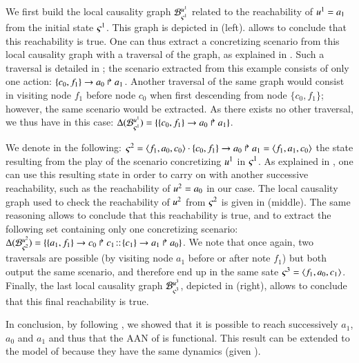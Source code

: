We first build the local causality graph ${\mathcal{B}_{\varsigma^1}^{u^1}}$
related to the reachability of $u^1 = a_1$ from the initial state $\varsigma^1$.
This graph is depicted in (left).
 allows to conclude that this reachability is true.
One can thus extract a concretizing scenario from this local causality graph
with a traversal of the graph, as explained in .
Such a traversal is detailed in ;
the scenario extracted from this example consists of only one action:
$\{c_0, f_1\}\rightarrow a_0\Rsh a_1$.
Another traversal of the same graph
would consist in visiting node $f_1$ before node $c_0$
when first descending from node $\{ c_0, f_1 \}$;
however, the same scenario would be extracted.
As there exists no other traversal, we thus have in this case:
$\Delta({\mathcal{B}_{\varsigma^1}^{u^1}}) = \{ \{c_0, f_1\}\rightarrow a_0\Rsh a_1 \}$.

We denote in the following:
$\varsigma^2 = \mbox{$\langle f_1, a_0, c_0 \rangle$} \cdot \{c_0, f_1\}\rightarrow a_0\Rsh a_1 =
\mbox{$\langle f_1, a_1, c_0 \rangle$}$
the state resulting from the play of the scenario concretizing
$u^1$ in $\varsigma^1$.
As explained in ,
one can use this resulting state in order to carry on with another
successive reachability,
such as the reachability of $u^2 = a_0$ in our case.
The local causality graph used to check the reachability of $u^2$
from $\varsigma^2$ is given in (middle).
The same reasoning allows to conclude that this reachability is true, and
to extract the following set containing only one concretizing scenario:
$\Delta({\mathcal{B}_{\varsigma^2}^{u^2}}) =
\{ \{a_1, f_1\}\rightarrow c_0\Rsh c_1 \!::\! \{c_1\}\rightarrow a_1\Rsh a_0 \}$.
We note that once again, two traversals are possible
(by visiting node $a_1$ before or after note $f_1$)
but both output the same scenario, and therefore end up in the same sate
$\varsigma^3 = \mbox{$\langle f_1, a_0, c_1 \rangle$}$.
Finally, the last local causality graph ${\mathcal{B}_{\varsigma^3}^{u^3}}$,
depicted in (right),
allows to conclude that this final reachability is true.

In conclusion, by following ,
we showed that it is possible to reach successively
$a_1$, $a_0$ and $a_1$
and thus that the AAN of  is functional.
This result can be extended to the model of 
because they have the same dynamics (given ).

